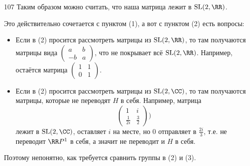 \documentclass[12pt,a4paper]{article}
\newcommand{\SL}{\ensuremath{\mathrm{SL}}\xspace}
\begin{document}
\begin{problem}{107}
        Таким образом можно считать, что наша матрица лежит в $\SL(2, \RR)$.

        Это действительно сочетается с пунктом (1), а вот с пунктом (2) есть вопросы:
        \begin{itemize}
            \item Если в (2) просится рассмотреть матрицы из $\SL(2, \RR)$, то там получаются матрицы вида $(\begin{smallmatrix}a&b\\-b&a\end{smallmatrix})$, что не покрывает всё $\SL(2, \RR)$. Например, остаётся матрица $(\begin{smallmatrix}1&1\\0&1\end{smallmatrix})$.
            \item Если в (2) просится рассмотреть матрицы из $\SL(2, \CC)$, то там получаются матрицы, которые не переводят $H$ в себя. Например, матрица
                \[\begin{pmatrix}1&i\\\frac{1}{2i}&\frac{3}{2}\end{pmatrix})\]
                лежит в $\SL(2, \CC)$, оставляет $i$ на месте, но $0$ отправляет в $\frac{2i}{3}$, т.е. не переводит $\RR P^1$ в себя, а значит не переводит и $H$ в себя.
        \end{itemize}
        Поэтому непонятно, как требуется сравнить группы в (2) и (3).
    \end{problem}
\end{document}
